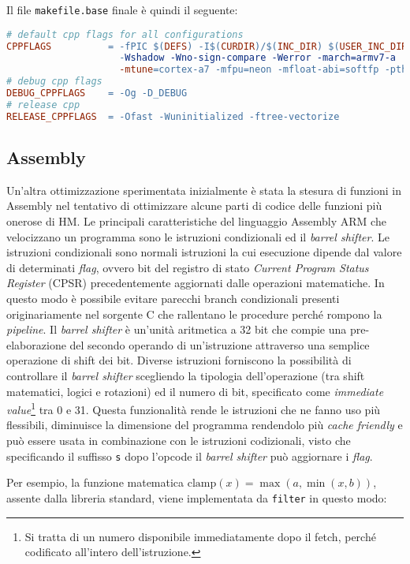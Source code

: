 Il file \verb|makefile.base| finale è quindi il seguente:\\

\begin{lstlisting}[language=make]
# default cpp flags for all configurations
CPPFLAGS          = -fPIC $(DEFS) -I$(CURDIR)/$(INC_DIR) $(USER_INC_DIRS) -Wall 
                    -Wshadow -Wno-sign-compare -Werror -march=armv7-a 
                    -mtune=cortex-a7 -mfpu=neon -mfloat-abi=softfp -pthread
# debug cpp flags
DEBUG_CPPFLAGS    = -Og -D_DEBUG
# release cpp
RELEASE_CPPFLAGS  = -Ofast -Wuninitialized -ftree-vectorize
\end{lstlisting}

\subsection{Assembly}
Un'altra ottimizzazione sperimentata inizialmente è stata la stesura di 
funzioni in Assembly nel tentativo di ottimizzare alcune parti di codice delle 
funzioni più onerose di HM.
Le principali caratteristiche del linguaggio Assembly ARM che velocizzano un 
programma sono le istruzioni condizionali ed il \emph{barrel shifter}. \newline
Le istruzioni condizionali sono normali istruzioni la cui esecuzione dipende
dal valore di determinati \emph{flag}, ovvero bit del registro di stato 
\emph{Current Program Status Register} (CPSR) precedentemente aggiornati dalle 
operazioni matematiche. In questo modo è possibile evitare 
parecchi branch condizionali presenti originariamente nel sorgente C che 
rallentano le 
procedure perché rompono la \emph{pipeline}.\newline
Il \emph{barrel shifter} è un'unità aritmetica a 32 bit che compie una 
pre-elaborazione del secondo operando di un'istruzione attraverso una semplice 
operazione di shift dei bit. Diverse istruzioni forniscono la possibilità di 
controllare il \emph{barrel shifter} scegliendo la tipologia dell'operazione 
(tra shift matematici, logici e rotazioni) ed il numero di bit, specificato 
come \emph{immediate value}\footnote{Si tratta di un numero 
disponibile immediatamente dopo il fetch, perché codificato 
all'intero dell'istruzione.} tra 0 e 31. Questa funzionalità rende le 
istruzioni che ne fanno uso più flessibili, diminuisce la dimensione del 
programma rendendolo più \emph{cache friendly} e può essere usata in 
combinazione con le istruzioni codizionali, visto che specificando il suffisso 
\verb|s| dopo l'opcode il \emph{barrel shifter} può aggiornare i \emph{flag}.
\par Per esempio, la funzione matematica $\text{clamp}(x) = 
\max(a,\min(x,b))$, assente dalla libreria standard, viene implementata da 
\verb+filter+ in questo modo: \\
\lstset{style=cstyle}


